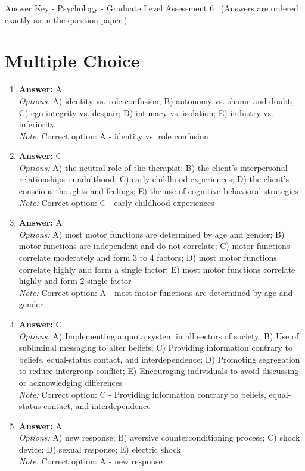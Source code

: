 \documentclass[12pt]{article}
\begin{document}
\begin{center}
Answer Key - Psychology - Graduate Level Assessment 6 \
\small (Answers are ordered exactly as in the question paper.)
\end{center}

\section*{Multiple Choice}
\begin{enumerate}[label=\arabic*.]
\item \textbf{Answer:} A
\\ \textit{Options:} A) identity vs. role confusion; B) autonomy vs. shame and doubt; C) ego integrity vs. despair; D) intimacy vs. isolation; E) industry vs. inferiority
\\ \textit{Note:} Correct option: A - identity vs. role confusion
\item \textbf{Answer:} C
\\ \textit{Options:} A) the neutral role of the therapist; B) the client's interpersonal relationships in adulthood; C) early childhood experiences; D) the client's conscious thoughts and feelings; E) the use of cognitive behavioral strategies
\\ \textit{Note:} Correct option: C - early childhood experiences
\item \textbf{Answer:} A
\\ \textit{Options:} A) most motor functions are determined by age and gender; B) motor functions are independent and do not correlate; C) motor functions correlate moderately and form 3 to 4 factors; D) most motor functions correlate highly and form a single factor; E) most motor functions correlate highly and form 2 single factor
\\ \textit{Note:} Correct option: A - most motor functions are determined by age and gender
\item \textbf{Answer:} C
\\ \textit{Options:} A) Implementing a quota system in all sectors of society; B) Use of subliminal messaging to alter beliefs; C) Providing information contrary to beliefs, equal-status contact, and interdependence; D) Promoting segregation to reduce intergroup conflict; E) Encouraging individuals to avoid discussing or acknowledging differences
\\ \textit{Note:} Correct option: C - Providing information contrary to beliefs, equal-status contact, and interdependence
\item \textbf{Answer:} A
\\ \textit{Options:} A) new response; B) aversive counterconditioning process; C) shock device; D) sexual response; E) electric shock
\\ \textit{Note:} Correct option: A - new response
\end{enumerate}
\end{document}
